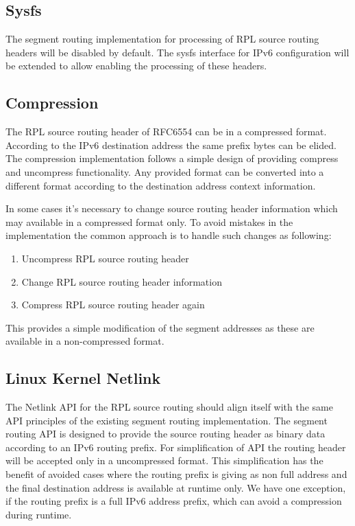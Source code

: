 \documentclass[letterpaper]{article}
\begin{document}
\subsection{Sysfs}

The segment routing implementation for processing of RPL source routing headers
will be disabled by default. The sysfs interface for IPv6 configuration will be
extended to allow enabling the processing of these headers.

\subsection{Compression}

The RPL source routing header of RFC6554 can be in a compressed format.
According to the IPv6 destination address the same prefix bytes can be elided.
The compression implementation follows a simple design of providing compress and uncompress functionality.
Any provided format can be converted into a different format according to the destination address context information.

In some cases it's necessary to change source routing header information which
may available in a compressed format only. To avoid mistakes in the
implementation the common approach is to handle such changes as following:

\begin{enumerate}
\item{Uncompress RPL source routing header}
\item{Change RPL source routing header information}
\item{Compress RPL source routing header again}
\end{enumerate}

This provides a simple modification of the segment addresses as these are available in a non-compressed format.

\subsection{Linux Kernel Netlink}

The Netlink API for the RPL source routing should align itself with the same API
principles of the existing segment routing implementation.
The segment routing API is designed to provide the source routing header as binary data according to an IPv6 routing prefix.
For simplification of API the routing header will be accepted only in a uncompressed format.
This simplification has the benefit of avoided cases where the routing prefix is
giving as non full address and the final destination address is available at runtime only.
We have one exception, if the routing prefix is a full IPv6 address prefix, which can avoid a compression during runtime.
\end{document}
